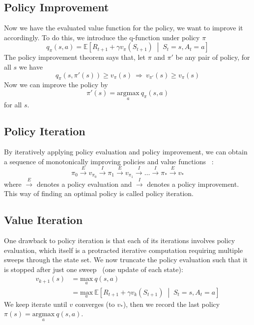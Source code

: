 \documentclass[balance,upint,subscriptcorrection,varvw,mathalfa=cal=boondoxo,pdf-a,nofoot]{asmeconf}
\begin{document}
\subsection{Policy Improvement}
\noindent Now we have the evaluated value function for the policy, we want to 
improve it accordingly. To do this, we introduce the q-function under 
policy \(\pi\)
\[q_\pi(s, a) = \mathbb{E}\left[R_{t+1} + \gamma v_\pi(S_{t+1})\;\middle|\;
S_t=s, A_t=a\right]\]
The policy improvement theorem says that, let \(\pi\) and \(\pi'\) be any pair
of policy, for all \(s\) we have
\[q_\pi(s, \pi'(s))\geq v_\pi(s) \:\Rightarrow\: v_{\pi'}(s) \geq v_\pi(s)\]
Now we can improve the policy by
\[\pi'(s)=\underset{a}{\text{argmax}}\:q_\pi(s,a)\]
for all \(s\).

\subsection{Policy Iteration}
\noindent By iteratively applying policy evaluation and policy improvement, we
can obtain a sequence of monotonically improving policies and value 
functions~\cite{Sutton1998} :
\[\pi_0 \overset{E}{\longrightarrow} v_{\pi_0} \overset{I}{\longrightarrow}
\pi_1 \overset{E}{\longrightarrow} v_{\pi_1} \overset{I}{\longrightarrow}
\dots \overset{I}{\longrightarrow} \pi_* \overset{E}{\longrightarrow} v_*\]
where \(\overset{E}{\longrightarrow}\) denotes a policy evaluation and
\(\overset{I}{\longrightarrow}\) denotes a policy improvement. This way of 
finding an optimal policy is called policy iteration.

\subsection{Value Iteration}
\noindent One drawback to policy iteration is that each of its iterations 
involves policy evaluation, which itself is a protracted iterative computation
requiring multiple sweeps through the state set.
\vspace{3mm}\newline We now truncate the policy evaluation such that it is
stopped after just one sweep~\cite{Sutton1998} (one update of each state):
\begin{align*}
    v_{k+1}(s)&=\underset{a}{\text{max}}\:q(s, a)\\
              &=\underset{a}{\text{max}}\:\mathbb{E}\left[
          R_{t+1}+\gamma v_k(S_{t+1})\;\middle|\;S_t=s, A_t=a\right]
\end{align*}
We keep iterate until \(v\) converges (to \(v_*\)), then we record the last
policy \(\pi(s) = \underset{a}{\text{argmax}}\:q(s, a)\).
\end{document}
